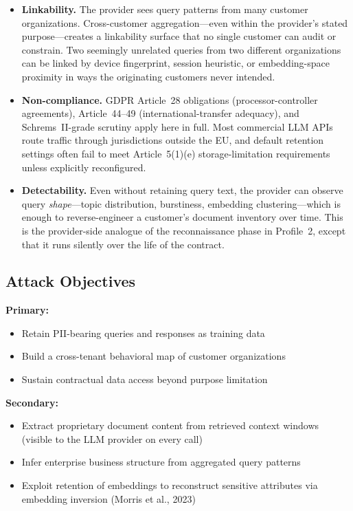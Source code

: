 \documentclass[12pt, a4paper]{report}
\begin{document}
\begin{prosebox}
\begin{itemize}[leftmargin=1.4em, itemsep=5pt]
  \item \textbf{Linkability.} The provider sees query patterns from many
        customer organizations. Cross-customer aggregation---even within
        the provider's stated purpose---creates a linkability surface that
        no single customer can audit or constrain. Two seemingly unrelated
        queries from two different organizations can be linked by device
        fingerprint, session heuristic, or embedding-space proximity in
        ways the originating customers never intended.
  \item \textbf{Non-compliance.} GDPR Article~28 obligations
        (processor-controller agreements), Article~44--49
        (international-transfer adequacy), and Schrems~II-grade scrutiny
        apply here in full. Most commercial LLM APIs route traffic through
        jurisdictions outside the EU, and default retention settings often
        fail to meet Article~5(1)(e) storage-limitation requirements
        unless explicitly reconfigured.
  \item \textbf{Detectability.} Even without retaining query text, the
        provider can observe query \emph{shape}---topic distribution,
        burstiness, embedding clustering---which is enough to reverse-engineer
        a customer's document inventory over time. This is the
        provider-side analogue of the reconnaissance phase in Profile~2,
        except that it runs silently over the life of the contract.
\end{itemize}
\end{prosebox}

\subsection{Attack Objectives}

\begin{prosebox}
\textbf{Primary:}
\begin{itemize}[leftmargin=1.4em, itemsep=2pt]
  \item Retain PII-bearing queries and responses as training data
  \item Build a cross-tenant behavioral map of customer organizations
  \item Sustain contractual data access beyond purpose limitation
\end{itemize}
\textbf{Secondary:}
\begin{itemize}[leftmargin=1.4em, itemsep=2pt]
  \item Extract proprietary document content from retrieved context windows
        (visible to the LLM provider on every call)
  \item Infer enterprise business structure from aggregated query patterns
  \item Exploit retention of embeddings to reconstruct sensitive attributes
        via embedding inversion (Morris et al., 2023)
\end{itemize}
\end{prosebox}
\end{document}
